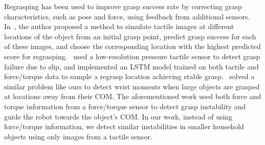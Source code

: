 Regrasping has been used to improve grasp success rate by correcting grasp characteristics, such as pose and force, using feedback from additional sensors. 
In~\cite{tactile_regrasp}, the author proposed a method to simulate tactile images at different locations of the object from an initial grasp point, predict grasp success for each of these images, and choose the corresponding location with the highest predicted score for regrasping.~\cite{Center-of-Mass} used a low-resolution pressure tactile sensor to detect grasp failure due to slip, and implemented an LSTM model trained on both tactile and force/torque data to sample a regrasp location achieving stable grasp.~\cite{Center-of-mass-grasp} solved a similar problem like ours to detect wrist moments when large objects are grasped at locations away from their COM. The aforementioned work used both force and torque information from a force/torque sensor to detect grasp instability and guide the robot towards the object's COM. In our work, instead of using force/torque information, we detect similar instabilities in smaller household objects using only images from a tactile sensor. 


